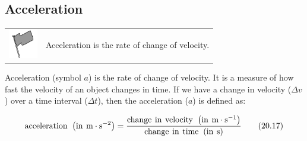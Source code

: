             \subsection{ Acceleration}
            \nopagebreak
            \par
            \label{m38794*fhsst!!!underscore!!!id1326}\begin{definition}
	  \begin{tabular*}{15 cm}{m{15 mm}m{}}
	\hspace*{-50pt}  \includegraphics[width=0.5in]{col11305.imgs/psflag2.png}   & \Definition{   \label{id2531677}\textbf{ Acceleration }} { \label{m38794*meaningfhsst!!!underscore!!!id1326}
      \label{m38794*id67550}Acceleration is the rate of change of velocity. \par 
       } 
      \end{tabular*}
      \end{definition}
      \label{m38794*id67562}Acceleration (symbol $a$) is the rate of change of velocity. It is a measure of how fast the velocity of an object changes in time. If we have a change in velocity ($\Delta v$) over a time interval ($\Delta t$), then the acceleration ($a$) is defined as:\par 
      \label{m38794*id67610}\nopagebreak\noindent{}
        
    \begin{equation}
    \mathrm{acceleration}\phantom{\rule{4pt}{0ex}}\left(\mathrm{in}\phantom{\rule{4pt}{0ex}}\mathrm{m}\ensuremath{\cdot}{\mathrm{s}}^{-2}\right)=\frac{\mathrm{change}\phantom{\rule{4pt}{0ex}}\mathrm{in}\phantom{\rule{4pt}{0ex}}\mathrm{velocity}\phantom{\rule{4pt}{0ex}}\left(\mathrm{in}\phantom{\rule{4pt}{0ex}}\mathrm{m}\ensuremath{\cdot}{\mathrm{s}}^{-1}\right)}{\mathrm{change}\phantom{\rule{4pt}{0ex}}\mathrm{in}\phantom{\rule{4pt}{0ex}}\mathrm{time}\phantom{\rule{4pt}{0ex}}\left(\mathrm{in}\phantom{\rule{4pt}{0ex}}\mathrm{s}\right)}\tag{20.17}
      \end{equation}
      \label{m38794*id67742}\nopagebreak\noindent{}
        
